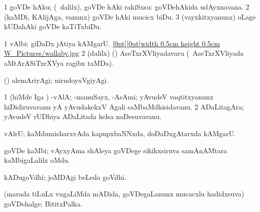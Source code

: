 {\bentry
{}
\gl{\sakirx}
\expl{}
\bmng
\bnum
\num{1} goVDe hAku; (\kanmu\ \BUkaq dalilx), goVDe hAki rakiSxsu:  goVDehAkida udAyxnavana. 
\num{2} (kaMDi, KAlijAga, \mo vanunx) goVDe hAki mucicx biDu.
\num{3} (vayxkitxyanunx) oLage kUDahAki goVDe kaTiTxbiDu. 
\enum
\emng
\eentry

{} 
\gl{\nA}
\bmng
\bnum
\num{1} vAlbi; giDaDx jAtiya kAMgarU. \quad \hyperlink{wallabyfigure}{\raisebox{-0.15cm}[0pt][0pt]{\pdfimage width 0.5cm height 0.5cm {W_Pictures/wallaby.jpg}}} 
\num{2}  (\bava dalilx) (\AmA) AseTxrXVliyadavaru (\kanmu\ AseTxrXVliyada aMtArASiTxrXVya ragibx taMDa). 
\enum
\emng

\noindent 
\gl{\pagu}
\expl{}
\bmng
{} (\AseTxrXV) alemAriyAgi; nirudoyxVgiyAgi. 
\emng
\eentry

\bentry
{} 
\gl{\gu}
\expl{}
\bmng
{} 
\emng
\eentry

\bentry
{} 
\gl{\nA}
\bmng
{} 
\emng
\eentry

\bentry
{} 
\gl{\nA}
\bmng
\bnum
\num{1} (hiMde \AMiM Iga \ashi) -vAlA; -manuSayx, -AsAmi; yAvudeV vaqtitxyanunx hiDidiruvavanu yA yAvudakekxV Agali saMbaMdhisidavanu. 
\num{2} ADaLitagAra; yAvudeV rUDhiya ADaLitada kelsa naDesuvavanu. 
\enum
\emng
\eentry

\bentry
{} 
\gl{\nA}
\bmng
vAlrU; kaMdumisharxvAda kapupxbaNNxda, doDaDxgAtarxda kAMgarU. 
\emng
\eentry

\bentry
{} 
\gl{\nA}
\expl{}
\bmng
goVDe kaMbi; vAyxyAma shAleya goVDege sikikxsiruva samAnAMtara kaMbigaLalilx oMdu. 
\emng
\eentry

\bentry
{} 
\gl{\nA}
\expl{}
\bmng
kADugoVdhi; joMDAgi beLeda goVdhi. 
\emng
\eentry

\bentry
{} 
\gl{\nA}
\expl{}
\bmng
(marada tiLuLx \mo vugaLiMda mADida, goVDegaLanunx mucacxlu hadidxsuva) goVDehalge; BititxPalka. 
\emng
\eentry

\bentry
{} 
\gl{\nA}
\expl{}
\bmng
{} 
\emng
\eentry

}
